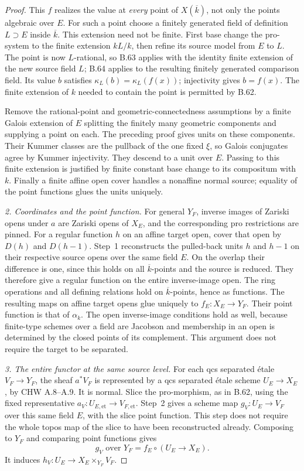 \documentclass[11pt,a4paper]{article}
\begin{document}
\begin{proof}
This \(f\) realizes the value at \emph{every} point of
\(X(\overline k)\), not only the points algebraic over \(E\).
For such a point choose a finitely generated field of definition
\(L\supset E\) inside \(\overline k\). This extension need
not be finite. First base change the pro-system to the finite
extension \(kL/k\), then refine its source model from \(E\)
to \(L\). The point is now \(L\)-rational, so B.63 applies
with the identity finite extension of the new source field
\(L\); B.64 applies to the resulting finitely generated
comparison field. Its value \(b\) satisfies
\(\kappa_L(b)=\kappa_L(f(x))\); injectivity gives
\(b=f(x)\). The finite extension of \(k\) needed to contain
the point is permitted by B.62.

Remove the rational-point and geometric-connectedness assumptions
by a finite Galois extension of \(E\) splitting the finitely
many geometric components and supplying a point on each. The
preceding proof gives units on these components. Their Kummer
classes are the pullback of the one fixed \(\xi\), so Galois
conjugates agree by Kummer injectivity. They descend to a unit
over \(E\). Passing to this finite extension is justified by
finite constant base change to its compositum with \(k\).
Finally a finite affine open cover handles a nonaffine normal
source; equality of the point functions glues the units uniquely.

\emph{2. Coordinates and the point function.}
For general \(Y_F\), inverse images of Zariski opens under
\(a\) are Zariski opens of \(X_E\), and the corresponding pro
restrictions are pinned. For a regular function \(h\) on an
affine target open, cover that open by \(D(h)\) and \(D(h-1)\).
Step~1 reconstructs the pulled-back units \(h\) and \(h-1\)
on their respective source opens over the same field \(E\).
On the overlap their difference is one, since this holds on
all \(\overline k\)-points and the source is reduced. They
therefore give a regular function on the entire inverse-image
open. The ring operations and all defining relations hold on
\(\overline k\)-points, hence as functions. The resulting maps
on affine target opens glue uniquely to
\(f_E:X_E\to Y_F\). Their point function is that of
\(\alpha_k\). The open inverse-image conditions hold as well,
because finite-type schemes over a field are Jacobson and
membership in an open is determined by the closed points of
its complement. This argument does not require the target to
be separated.

\emph{3. The entire functor at the same source level.}
For each qcs separated étale \(V_F\to Y_F\), the sheaf
\(a^*V_F\) is represented by a qcs separated étale scheme
\(U_E\to X_E\), by CHW A.8--A.9. It is normal. Slice the
pro-morphism, as in B.62, using the fixed representative
\(a_V:U_{E,\mathrm{et}}\to V_{F,\mathrm{et}}\).
Step~2 gives a scheme map \(g_V:U_E\to V_F\) over this
same field \(E\), with the slice point function. This step
does not require the whole topos map of the slice to have been
reconstructed already. Composing to \(Y_F\) and comparing
point functions gives
\[
                 g_V\text{ over }Y_F
                    = f_E\circ(U_E\to X_E).
\]
It induces \(h_V:U_E\to X_E\times_{Y_F}V_F\).


\end{proof}
\end{document}
